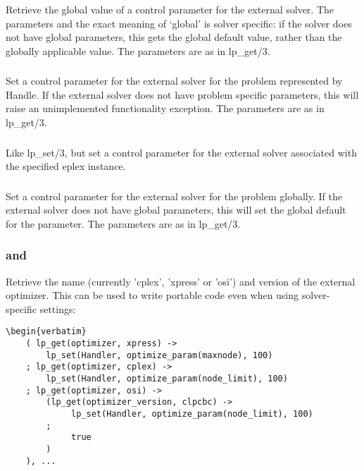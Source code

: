 \subsubsection{}
Retrieve the global value of a control parameter for the external solver. The
parameters and the exact meaning of `global' is solver specific: if the
solver does not have global parameters, this gets the global default value,
rather than the globally applicable value. The parameters are as in lp_get/3.

\subsubsection{}
Set a control parameter for the external solver for the problem represented
by Handle. If the external solver does not have problem specific
parameters, this will raise an unimplemented functionality exception. 
The parameters are as in lp_get/3.

\subsubsection{}
Like lp_set/3, but set a control parameter for the external solver
associated with the specified eplex instance. 

\subsubsection{}
Set a control parameter for the external solver for the problem globally.
If the external solver does not have global parameters, this will set the
global default for the parameter. The parameters are as in lp_get/3.

\subsubsection{
and }
Retrieve the name (currently 'cplex', 'xpress' or 'osi') and version of the 
external optimizer.
This can be used to write portable code even when using solver-specific settings:
\begin{verbatim}
\begin{verbatim}
    ( lp_get(optimizer, xpress) ->
        lp_set(Handler, optimize_param(maxnode), 100)
    ; lp_get(optimizer, cplex) ->
        lp_set(Handler, optimize_param(node_limit), 100)
    ; lp_get(optimizer, osi) ->
        (lp_get(optimizer_version, clpcbc) -> 
             lp_set(Handler, optimize_param(node_limit), 100)
        ;
             true
        )
    ), ...
\end{verbatim}

